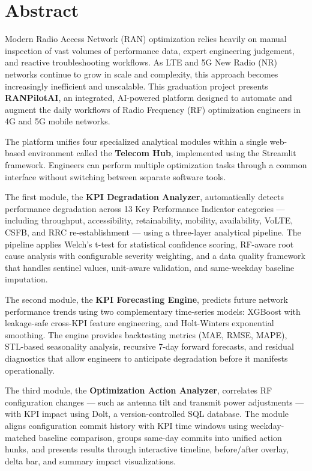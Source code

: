\chapter*{Abstract}

Modern Radio Access Network (RAN) optimization relies heavily on manual inspection of vast volumes of performance data, expert engineering judgement, and reactive troubleshooting workflows. As LTE and 5G New Radio (NR) networks continue to grow in scale and complexity, this approach becomes increasingly inefficient and unscalable. This graduation project presents \textbf{RANPilotAI}, an integrated, AI-powered platform designed to automate and augment the daily workflows of Radio Frequency (RF) optimization engineers in 4G and 5G mobile networks.

The platform unifies four specialized analytical modules within a single web-based environment called the \textbf{Telecom Hub}, implemented using the Streamlit framework. Engineers can perform multiple optimization tasks through a common interface without switching between separate software tools.

The first module, the \textbf{KPI Degradation Analyzer}, automatically detects performance degradation across 13 Key Performance Indicator categories — including throughput, accessibility, retainability, mobility, availability, VoLTE, CSFB, and RRC re-establishment — using a three-layer analytical pipeline. The pipeline applies Welch's t-test for statistical confidence scoring, RF-aware root cause analysis with configurable severity weighting, and a data quality framework that handles sentinel values, unit-aware validation, and same-weekday baseline imputation.

The second module, the \textbf{KPI Forecasting Engine}, predicts future network performance trends using two complementary time-series models: XGBoost with leakage-safe cross-KPI feature engineering, and Holt-Winters exponential smoothing. The engine provides backtesting metrics (MAE, RMSE, MAPE), STL-based seasonality analysis, recursive 7-day forward forecasts, and residual diagnostics that allow engineers to anticipate degradation before it manifests operationally.

The third module, the \textbf{Optimization Action Analyzer}, correlates RF configuration changes — such as antenna tilt and transmit power adjustments — with KPI impact using Dolt, a version-controlled SQL database. The module aligns configuration commit history with KPI time windows using weekday-matched baseline comparison, groups same-day commits into unified action hunks, and presents results through interactive timeline, before/after overlay, delta bar, and summary impact visualizations.

